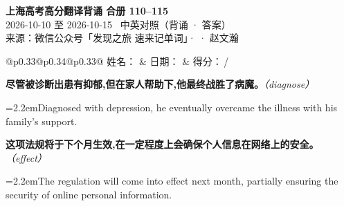 \documentclass[11pt,a4paper]{article}
\newcommand{\num}[1]{\makebox[1.9em][r]{#1.}\hspace{0.3em}}
\newcommand{\prompt}[1]{\emph{\textcolor{tipblue}{\small（#1）}}}
\begin{document}
\pagestyle{plain}
\begin{center}
{\LARGE\bfseries 上海高考高分翻译背诵 \quad 合册 110–115}\\[0.25em]
{\large 2026-10-10 至 2026-10-15 \quad\ 中英对照（背诵 · 答案）}\\[0.35em]
{\footnotesize 来源：微信公众号「发现之旅 速来记单词」·  · 赵文瀚}
\end{center}

\vspace{0.4em}
\noindent\begin{tabular}{@{}p{0.33\textwidth}@{}p{0.34\textwidth}@{}p{0.33\textwidth}@{}}
姓名：\underline{\hspace{2.0cm}} & 日期：\underline{\hspace{2.0cm}} & 得分：\underline{\hspace{1.4cm}}\,/ \\
\end{tabular}

\vspace{0.5em}

\vspace{0.8em}
\vspace{0.35em}\vspace{0.15em}

\begin{minipage}{\linewidth}

\num{1}\textbf{尽管被诊断出患有抑郁,但在家人帮助下,他最终战胜了病魔。}\prompt{diagnose}

\vspace{0.15em}

\noindent\hangindent=2.2em\hspace{2.2em}Diagnosed with depression, he eventually overcame the illness with his family’s support.

\end{minipage}

\begin{minipage}{\linewidth}

\num{2}\textbf{这项法规将于下个月生效,在一定程度上会确保个人信息在网络上的安全。}\prompt{effect}

\vspace{0.15em}

\noindent\hangindent=2.2em\hspace{2.2em}The regulation will come into effect next month, partially ensuring the security of online personal information.

\end{minipage}
\end{document}
